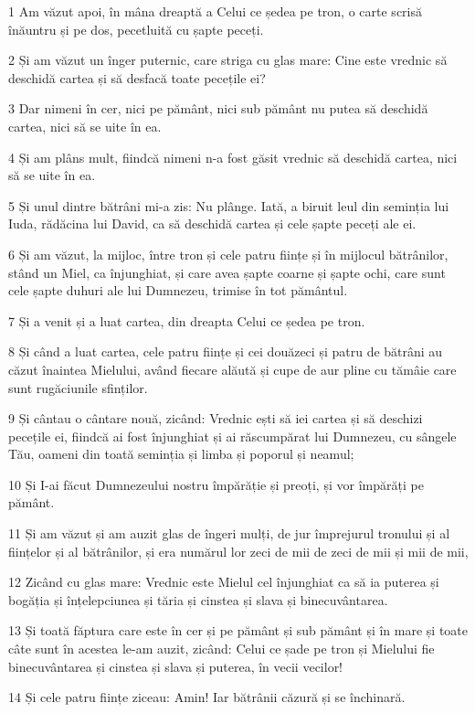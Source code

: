 \par 1 Am văzut apoi, în mâna dreaptă a Celui ce ședea pe tron, o carte scrisă înăuntru și pe dos, pecetluită cu șapte peceți.
\par 2 Și am văzut un înger puternic, care striga cu glas mare: Cine este vrednic să deschidă cartea și să desfacă toate pecețile ei?
\par 3 Dar nimeni în cer, nici pe pământ, nici sub pământ nu putea să deschidă cartea, nici să se uite în ea.
\par 4 Și am plâns mult, fiindcă nimeni n-a fost găsit vrednic să deschidă cartea, nici să se uite în ea.
\par 5 Și unul dintre bătrâni mi-a zis: Nu plânge. Iată, a biruit leul din seminția lui Iuda, rădăcina lui David, ca să deschidă cartea și cele șapte peceți ale ei.
\par 6 Și am văzut, la mijloc, între tron și cele patru ființe și în mijlocul bătrânilor, stând un Miel, ca înjunghiat, și care avea șapte coarne și șapte ochi, care sunt cele șapte duhuri ale lui Dumnezeu, trimise în tot pământul.
\par 7 Și a venit și a luat cartea, din dreapta Celui ce ședea pe tron.
\par 8 Și când a luat cartea, cele patru ființe și cei douăzeci și patru de bătrâni au căzut înaintea Mielului, având fiecare alăută și cupe de aur pline cu tămâie care sunt rugăciunile sfinților.
\par 9 Și cântau o cântare nouă, zicând: Vrednic ești să iei cartea și să deschizi pecețile ei, fiindcă ai fost înjunghiat și ai răscumpărat lui Dumnezeu, cu sângele Tău, oameni din toată seminția și limba și poporul și neamul;
\par 10 Și I-ai făcut Dumnezeului nostru împărăție și preoți, și vor împărăți pe pământ.
\par 11 Și am văzut și am auzit glas de îngeri mulți, de jur împrejurul tronului și al ființelor și al bătrânilor, și era numărul lor zeci de mii de zeci de mii și mii de mii,
\par 12 Zicând cu glas mare: Vrednic este Mielul cel înjunghiat ca să ia puterea și bogăția și înțelepciunea și tăria și cinstea și slava și binecuvântarea.
\par 13 Și toată făptura care este în cer și pe pământ și sub pământ și în mare și toate câte sunt în acestea le-am auzit, zicând: Celui ce șade pe tron și Mielului fie binecuvântarea și cinstea și slava și puterea, în vecii vecilor!
\par 14 Și cele patru ființe ziceau: Amin! Iar bătrânii căzură și se închinară.

